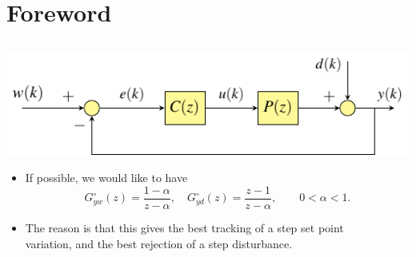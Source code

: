 \section{Foreword}
\subsection{}

\begin{frame}
\myPause
 \begin{center}
  \includegraphics[width=0.50\columnwidth]{./Unit-04/img/ControlLoop-H1.pdf}
 \end{center}\myPause
 \begin{itemize}[<+-| alert@+>]
 \item If possible, we would like to have
       \begin{displaymath}
        G_{yw}^{\circ}(z) = \frac{1-\alpha}{z-\alpha}, \quad
        G_{yd}^{\circ}(z) = \frac{z-1}{z-\alpha}, \qquad
        0 < \alpha < 1.
       \end{displaymath}
 \item The reason is that this gives the best tracking of a step set point\\
       variation, and the best rejection of a step disturbance. 
 \end{itemize}
\end{frame}

